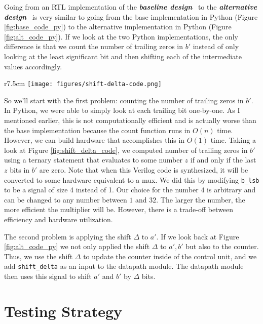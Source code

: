\documentclass[10pt]{article}
\newcommand{\baseline}[0]{\textit{\textbf{baseline design}}}
\newcommand{\alternative}[0]{\textit{\textbf{alternative design}}}
\begin{document}
	Going from an RTL implementation of the \baseline~ to the \alternative~ is very similar to going from the base implementation in Python (Figure \ref{fig:base_code_py}) to the alternative implementation in Python (Figure \ref{fig:alt_code_py}). If we look at the two Python implementations, the only difference is that we count the number of trailing zeros in $b'$ instead of only looking at the least significant bit and then shifting each of the intermediate values accordingly.
	
	\begin{wrapfigure}{r}{7.5cm}
		\texttt{[image: figures/shift-delta-code.png]} 
		\caption{Excerpt of the Alternative Control Unit Implementation Showing Shift $\Delta$ Calculation}
		\label{fig:shift_delta_code}
	\end{wrapfigure} 

	\noindent So we'll start with the first problem: counting the number of trailing zeros in $b'$. In Python, we were able to simply look at each trailing bit one-by-one. As I mentioned earlier, this is not computationally efficient and is actually worse than the base implementation because the count function runs in $O(n)$ time. However, we can build hardware that accomplishes this in $O(1)$ time. Taking a look at Figure \ref{fig:shift_delta_code}, we computed number of trailing zeros in $b'$ using a ternary statement that evaluates to some number $z$ if and only if the last $z$ bits in $b'$ are zero. Note that when this Verilog code is synthesized, it will be converted to some hardware equivalent to a mux. We did this by modifying \texttt{b\_lsb} to be a signal of size 4 instead of 1. Our choice for the number $4$ is arbitrary and can be changed to any number between $1$ and $32$. The larger the number, the more efficient the multiplier will be. However, there is a trade-off between efficiency and hardware utilization.

	The second problem is applying the shift $\Delta$ to $a'$. If we look back at Figure \ref{fig:alt_code_py} we not only applied the shift $\Delta$ to $a',b'$ but also to the counter. Thus, we use the shift $\Delta$ to update the counter inside of the control unit, and we add \texttt{shift\_delta} as an input to the datapath module. The datapath module then uses this signal to shift $a'$ and $b'$ by $\Delta$ bits.
	
	\section{Testing Strategy}
	\label{sec:testing_strategy}
\end{document}
